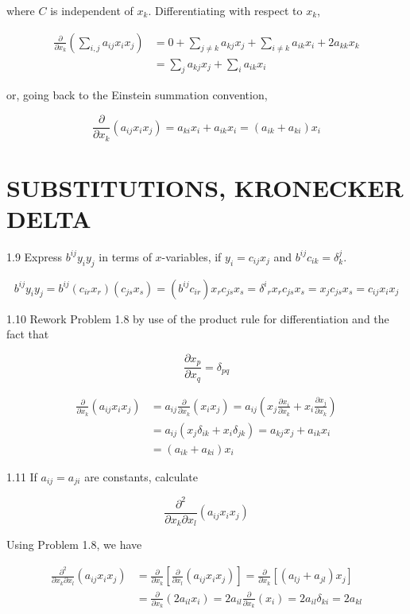 \documentclass[10pt]{article}
\begin{document}
where $C$ is independent of $x_{k}$. Differentiating with respect to $x_{k}$,

$$
\begin{aligned}
\frac{\partial}{\partial x_{k}}\left(\sum_{i, j} a_{i j} x_{i} x_{j}\right) & =0+\sum_{j \neq k} a_{k j} x_{j}+\sum_{i \neq k} a_{i k} x_{i}+2 a_{k k} x_{k} \\
& =\sum_{j} a_{k j} x_{j}+\sum_{i} a_{i k} x_{i}
\end{aligned}
$$

or, going back to the Einstein summation convention,

$$
\frac{\partial}{\partial x_{k}}\left(a_{i j} x_{i} x_{j}\right)=a_{k i} x_{i}+a_{i k} x_{i}=\left(a_{i k}+a_{k i}\right) x_{i}
$$

\section*{SUBSTITUTIONS, KRONECKER DELTA}
1.9 Express $b^{i j} y_{i} y_{j}$ in terms of $x$-variables, if $y_{i}=c_{i j} x_{j}$ and $b^{i j} c_{i k}=\delta_{k}^{j}$.

$$
b^{i j} y_{i} y_{j}=b^{i j}\left(c_{i r} x_{r}\right)\left(c_{j s} x_{s}\right)=\left(b^{i j} c_{i r}\right) x_{r} c_{j s} x_{s}=\delta^{i}{ }_{r} x_{r} c_{j s} x_{s}=x_{j} c_{j s} x_{s}=c_{i j} x_{i} x_{j}
$$

1.10 Rework Problem 1.8 by use of the product rule for differentiation and the fact that

$$
\frac{\partial x_{p}}{\partial x_{q}}=\delta_{p q}
$$

$$
\begin{aligned}
\frac{\partial}{\partial x_{k}}\left(a_{i j} x_{i} x_{j}\right) & =a_{i j} \frac{\partial}{\partial x_{k}}\left(x_{i} x_{j}\right)=a_{i j}\left(x_{j} \frac{\partial x_{i}}{\partial x_{k}}+x_{i} \frac{\partial x_{j}}{\partial x_{k}}\right) \\
& =a_{i j}\left(x_{j} \delta_{i k}+x_{i} \delta_{j k}\right)=a_{k j} x_{j}+a_{i k} x_{i} \\
& =\left(a_{i k}+a_{k i}\right) x_{i}
\end{aligned}
$$

1.11 If $a_{i j}=a_{j i}$ are constants, calculate

$$
\frac{\partial^{2}}{\partial x_{k} \partial x_{l}}\left(a_{i j} x_{i} x_{j}\right)
$$

Using Problem 1.8, we have

$$
\begin{aligned}
\frac{\partial^{2}}{\partial x_{k} \partial x_{l}}\left(a_{i j} x_{i} x_{j}\right) & =\frac{\partial}{\partial x_{k}}\left[\frac{\partial}{\partial x_{l}}\left(a_{i j} x_{i} x_{j}\right)\right]=\frac{\partial}{\partial x_{k}}\left[\left(a_{l j}+a_{j l}\right) x_{j}\right] \\
& =\frac{\partial}{\partial x_{k}}\left(2 a_{i l} x_{i}\right)=2 a_{i l} \frac{\partial}{\partial x_{k}}\left(x_{i}\right)=2 a_{i l} \delta_{k i}=2 a_{k l}
\end{aligned}
$$
\end{document}
